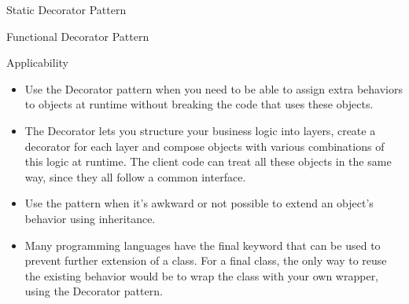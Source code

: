 \documentclass[13pt]{beamer}
\begin{document}
\begin{frame}{Static Decorator Pattern}
	\begin{center}
	\end{center}
\end{frame}

\begin{frame}{Functional Decorator Pattern}
	\begin{center}
	\end{center}
\end{frame}

\begin{frame}{Applicability}
	\begin{itemize}
		\item Use the Decorator pattern when you need to be able to assign extra behaviors to objects at runtime without breaking the code that uses these objects.
		\item The Decorator lets you structure your business logic into layers, create a decorator for each layer and compose objects with various combinations of this logic at runtime. The client code can treat all these objects in the same way, since they all follow a common interface.
		\item Use the pattern when it’s awkward or not possible to extend an object’s behavior using inheritance.
		\item Many programming languages have the final keyword that can be used to prevent further extension of a class. For a final class, the only way to reuse the existing behavior would be to wrap the class with your own wrapper, using the Decorator pattern.
	\end{itemize}
\end{frame}
\end{document}
